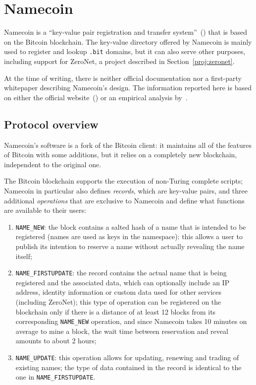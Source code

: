 \documentclass[mscthesis]{usiinfthesis}
\begin{document}
\section{Namecoin}\label{proj:namecoin}

Namecoin is a ``key-value pair registration and transfer system''~(\cite{namecoin}) that is based on the Bitcoin blockchain. The key-value directory offered by Namecoin is mainly used to register and lookup \texttt{.bit} domains, but it can also serve other purposes, including support for ZeroNet, a project described in Section~\ref{proj:zeronet}.

At the time of writing, there is neither official documentation nor a first-party whitepaper describing Namecoin's design. The information reported here is based on either the official website~(\cite{namecoin}) or an empirical analysis by~\cite{kalodner2015empirical}.

\subsection{Protocol overview}\label{sec:namecoindesc}
Namecoin's software is a fork of the Bitcoin client: it maintains all of the features of Bitcoin with some additions, but it relies on a completely new blockchain, independent to the original one.

The Bitcoin blockchain supports the execution of non-Turing complete scripts; Namecoin in particular also defines \emph{records}, which are key-value pairs, and three additional \emph{operations} that are exclusive to Namecoin and define what functions are available to their users:
\begin{enumerate}
	\item \texttt{NAME\_NEW}: the block contains a salted hash of a name that is intended to be registered (names are used as keys in the namespace): this allows a user to publish its intention to reserve a name without actually revealing the name itself;
	\item \texttt{NAME\_FIRSTUPDATE}: the record contains the actual name that is being registered and the associated data, which can optionally include an IP address, identity information or custom data used for other services (including ZeroNet); this type of operation can be registered on the blockchain only if there is a distance of at least 12 blocks from its corresponding \texttt{NAME\_NEW} operation, and since Namecoin takes 10 minutes on average to mine a block, the wait time between reservation and reveal amounts to about 2 hours;
	\item \texttt{NAME\_UPDATE}: this operation allows for updating, renewing and trading of existing names; the type of data contained in the record is identical to the one in \texttt{NAME\_FIRSTUPDATE}.
\end{enumerate}
\end{document}
